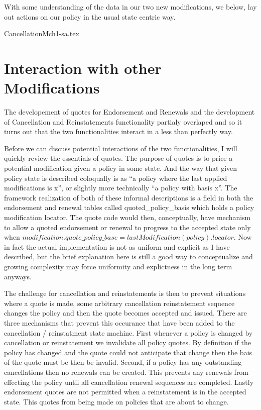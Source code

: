With some understanding of the data in our two new modifications, we below, lay out actions on our policy in the usual
state centric way. 

{CancellationMch1-sa.tex}

\section{Interaction with other Modifications}
The developement of quotes for Endorsement and Renewals and the development of Cancellation and Reinstatements functionality
partialy overlaped and so it turns out that the two functionalities interact in a less than perfectly way.

Before we can discuss potential interactions of the two functionalities, I will quickly review the essentials of quotes. The
purpose of quotes is to price a potential modification given a policy in some state. And the way that given policy state is described
coloqually is as ``a policy where the last applied modifications is x'', or slightly more technically ``a policy with basis x''. The
framework realization of both of these informal descriptions is a field in both the endorsement and
renewal tables called quoted\_policy\_basis which holds a policy modification locator. The quote code would then, conceptually, have
mechanism to allow a quoted endorsement or renewal to progress to the accepted state only when
$ modification.quote\_policy\_base = lastModification(policy).locator $. Now in
fact the actual implementation is not as uniform and explicit as I have described, but the brief explanation here is still a good way
to conceptualize and growing complexity may force uniformity and explictness in the long term anyways.

The challenge for cancellation and reinstatements is then to prevent situations where a quote is made, some arbitrary cancellation
reinstatement sequence changes the policy and then the quote becomes accepted and issued. There are three mechanisms that
prevent this occurance that have been added to the cancellation / reinstatment state machine. First whenever a policy is
changed by cancellation or reinstatement we invalidate all policy quotes. By definition if the policy has changed and the quote
could not anticipate that change then the bais of the quote must be then be invalid. Second, if a policy has any outstanding
cancellations then no renewals can be created. This prevents any renewals from effecting the policy until all cancellation
renewal sequences are completed. Lastly endorsement quotes are not permitted when a reinstatement is in the accepted state. This
quotes from being made on policies that are about to change.

